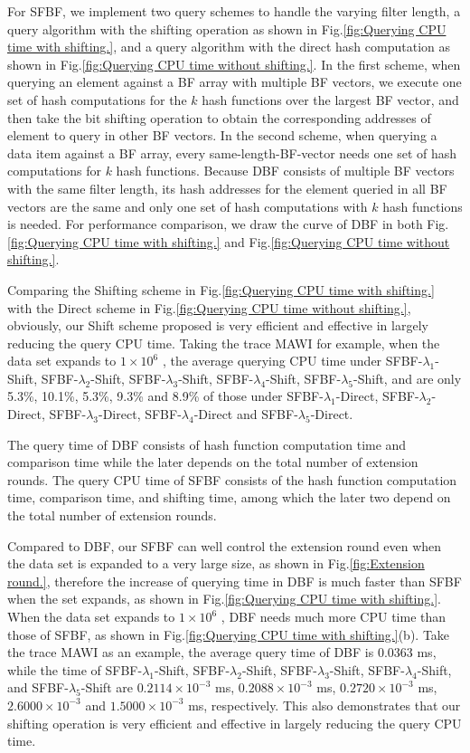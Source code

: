 \documentclass[10pt,journal,compsoc]{IEEEtran}
\newcommand{\DataSetSize}{$1 \times 10^6$ }
\begin{document}
For SFBF, we implement two query schemes to handle the varying filter length, a query algorithm with the shifting operation as shown in Fig.\ref{fig:Querying CPU time with shifting.}, and a query algorithm with the direct hash computation as shown in Fig.\ref{fig:Querying CPU time without shifting.}. In the first scheme, when querying an element against a BF array with multiple BF vectors, we execute one set of hash computations for the $k$ hash functions over the largest BF vector, and then take the bit shifting operation to obtain the corresponding addresses of element to query in other BF vectors. In the second scheme, when querying a data item against a BF array, every same-length-BF-vector needs one set of hash computations for $k$ hash functions. Because DBF consists of multiple BF vectors with the same filter length, its  hash addresses for the element queried in all BF vectors are the same and only one set of hash computations with $k$ hash functions is needed. For performance comparison, we draw the curve of DBF in both Fig.\ref{fig:Querying CPU time with shifting.} and Fig.\ref{fig:Querying CPU time without shifting.}.


 Comparing the Shifting scheme in Fig.\ref{fig:Querying CPU time with shifting.}  with the Direct scheme in Fig.\ref{fig:Querying CPU time without shifting.}, obviously, our Shift scheme proposed is very efficient and effective in largely reducing the query CPU time. Taking the trace MAWI for example, when the data set expands to \DataSetSize, the average querying CPU time under SFBF-$\lambda_1$-Shift, SFBF-$\lambda_2$-Shift, SFBF-$\lambda_3$-Shift, SFBF-$\lambda_4$-Shift, SFBF-$\lambda_5$-Shift, and are only 5.3\%, 10.1\%, 5.3\%, 9.3\% and 8.9\% of those under SFBF-$\lambda_1$-Direct, SFBF-$\lambda_2$-Direct, SFBF-$\lambda_3$-Direct, SFBF-$\lambda_4$-Direct and SFBF-$\lambda_5$-Direct.

The query time of DBF consists of hash function computation time and comparison time while the later depends on the total number of extension rounds. The query CPU time of SFBF consists of the hash function computation time, comparison time, and shifting time, among which the later two depend on the total number of extension rounds.

 Compared to DBF, our SFBF can well control the extension round even when the data set is expanded to a very large size, as shown in Fig.\ref{fig:Extension round.}, therefore the increase of querying time in DBF is much faster than SFBF when the set expands, as shown in Fig.\ref{fig:Querying CPU time with shifting.}. When the data set expands to \DataSetSize, DBF needs much more CPU time than those of SFBF, as shown in Fig.\ref{fig:Querying CPU time with shifting.}(b). Take the trace MAWI as an example, the average query time of DBF is 0.0363 ms, while the time of SFBF-$\lambda_1$-Shift, SFBF-$\lambda_2$-Shift, SFBF-$\lambda_3$-Shift, SFBF-$\lambda_4$-Shift, and SFBF-$\lambda_5$-Shift are $0.2114 \times 10^{-3}$ ms, $0.2088 \times 10^{-3}$ ms, $0.2720 \times 10^{-3}$ ms, $2.6000 \times 10^{-3}$ and $1.5000 \times 10^{-3}$ ms, respectively. This also   demonstrates that our shifting operation is  very
efficient and effective in largely reducing the query CPU time.
\end{document}
